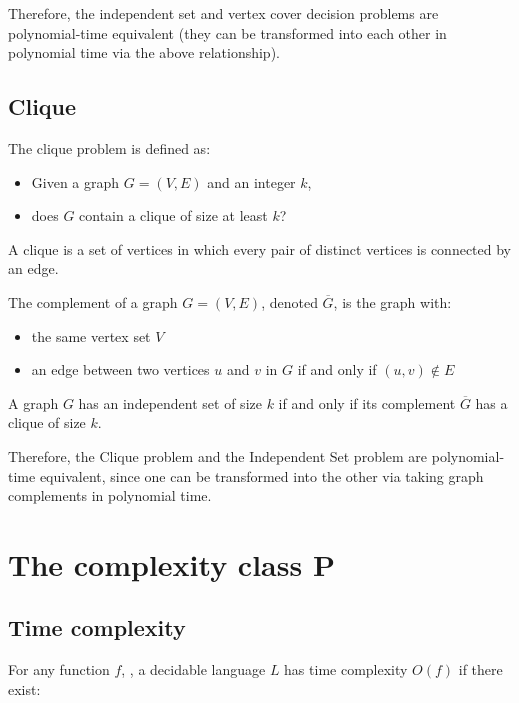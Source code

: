 \documentclass[11pt]{article}
\providecommand{\tightlist}{%
      \setlength{\itemsep}{0pt}\setlength{\parskip}{0pt}}
\begin{document}
Therefore, the independent set and vertex cover decision problems are
polynomial-time equivalent (they can be transformed into each other in
polynomial time via the above relationship).

    \subsection{Clique}\label{clique}

The clique problem is defined as:

\begin{itemize}
\tightlist
\item
  Given a graph \(G=(V,E)\) and an integer \(k\),
\item
  does \(G\) contain a clique of size at least \(k\)?
\end{itemize}

A clique is a set of vertices in which every pair of distinct vertices
is connected by an edge.

The complement of a graph \(G=(V,E)\), denoted \(\overline{G}\), is the
graph with:

\begin{itemize}
\tightlist
\item
  the same vertex set \(V\)
\item
  an edge between two vertices \(u\) and \(v\) in \(G\) if and only if
  \((u,v) \not\in E\)
\end{itemize}

A graph \(G\) has an independent set of size \(k\) if and only if its
complement \(\overline{G}\) has a clique of size \(k\).

Therefore, the Clique problem and the Independent Set problem are
polynomial-time equivalent, since one can be transformed into the other
via taking graph complements in polynomial time.

    \section{\texorpdfstring{The complexity class
\textbf{P}}{The complexity class P}}\label{the-complexity-class-p}

\subsection{Time complexity}\label{time-complexity}

For any function \(f\), , a decidable language \(L\) has time complexity
\(O(f)\) if there exist:
\end{document}
